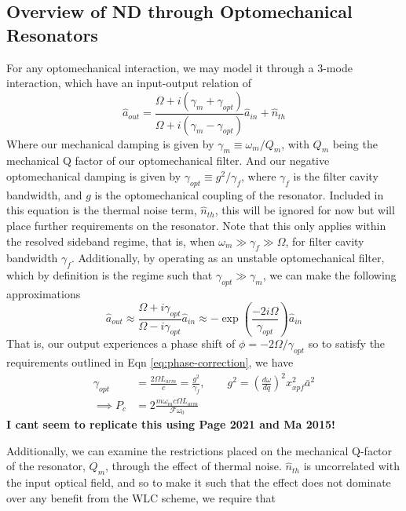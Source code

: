 \documentclass[aps,  
                a4paper, 
                amsmath, 
                amssymb, 
                preprint,
                tightenlines,  
                amsfonts,
                nofootinbib,
                onecolumn,
                titlepage,
                10pt
            ]{revtex4-2}
\begin{document}
    \subsection{Overview of ND through Optomechanical Resonators}
    For any optomechanical interaction, we may model it through a 3-mode interaction, which have an input-output relation of
    \begin{equation}
        \label{eq:3-mode-in-out}
        \hat{a}_{out}=\frac{\Omega+i(\gamma_m+\gamma_{opt})}{\Omega+i(\gamma_m-\gamma_{opt})}\hat{a}_{in} + \hat{n}_{th}
    \end{equation}
    Where our mechanical damping is given by $\gamma_m\equiv\omega_m/Q_m$, with $Q_m$ being the mechanical Q factor of our optomechanical filter. And our negative optomechanical damping is given by $\gamma_{opt}\equiv g^2/\gamma_f$, where $\gamma_f$ is the filter cavity bandwidth, and $g$ is the optomechanical coupling of the resonator. Included in this equation is the thermal noise term, $\hat{n}_{th}$, this will be ignored for now but will place further requirements on the resonator. Note that this only applies within the resolved sideband regime, that is, when $\omega_m\gg\gamma_f\gg\Omega$, for filter cavity bandwidth $\gamma_f$. Additionally, by operating as an unstable optomechanical filter, which by definition is the regime such that $\gamma_{opt}\gg\gamma_m$, we can make the following approximations
    \begin{equation}
        \label{eq:in-out-approx}
        \hat{a}_{out}\approx\frac{\Omega+i\gamma_{opt}}{\Omega-i\gamma_{opt}}\hat{a}_{in}\approx-\exp{\left(\frac{-2i\Omega}{\gamma_{opt}}\right)}\hat{a}_{in}
    \end{equation}
    That is, our output experiences a phase shift of $\phi=-2\Omega/\gamma_{opt}$ so to satisfy the requirements outlined in Eqn \eqref{eq:phase-correction}, we have
    \begin{align}
        \label{eq:gamma-opt-req}
        \gamma_{opt}&=\frac{2\Omega L_{arm}}{c}=\frac{g^2}{\gamma_f}, \qquad g^2=\left(\frac{d\omega}{dq}\right)^2x_{xpf}^2\bar{a}^2\\
        \label{eq:filter-power-req}
        \implies P_c&=2\frac{m\omega_m c \Omega L_{arm}}{\mathcal{F}\omega_0}
    \end{align}
    \textbf{\color{red} I cant seem to replicate this using Page 2021 and Ma 2015!}
    \par
    Additionally, we can examine the restrictions placed on the mechanical Q-factor of the resonator, $Q_m$, through the effect of thermal noise. $\hat{n}_{th}$ is uncorrelated with the input optical field, and so to make it such that the effect does not dominate over any benefit from the WLC scheme, we require that
\end{document}
